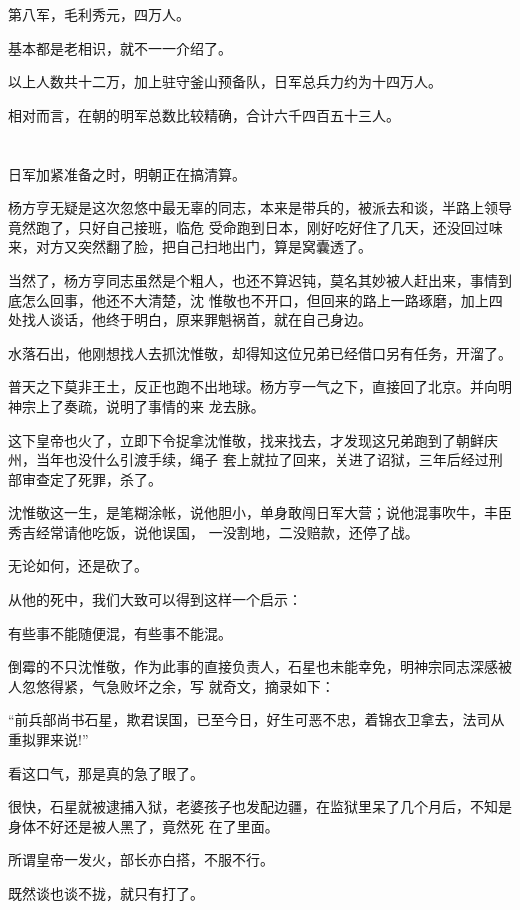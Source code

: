 \documentclass[11pt,a4paper,onecolumn]{article}
\begin{document}
第八军，毛利秀元，四万人。

基本都是老相识，就不一一介绍了。

以上人数共十二万，加上驻守釜山预备队，日军总兵力约为十四万人。

相对而言，在朝的明军总数比较精确，合计六千四百五十三人。

\section[\thesection]{}

日军加紧准备之时，明朝正在搞清算。

杨方亨无疑是这次忽悠中最无辜的同志，本来是带兵的，被派去和谈，半路上领导竟然跑了，只好自己接班，临危
受命跑到日本，刚好吃好住了几天，还没回过味来，对方又突然翻了脸，把自己扫地出门，算是窝囊透了。

当然了，杨方亨同志虽然是个粗人，也还不算迟钝，莫名其妙被人赶出来，事情到底怎么回事，他还不大清楚，沈
惟敬也不开口，但回来的路上一路琢磨，加上四处找人谈话，他终于明白，原来罪魁祸首，就在自己身边。

水落石出，他刚想找人去抓沈惟敬，却得知这位兄弟已经借口另有任务，开溜了。

普天之下莫非王土，反正也跑不出地球。杨方亨一气之下，直接回了北京。并向明神宗上了奏疏，说明了事情的来
龙去脉。

这下皇帝也火了，立即下令捉拿沈惟敬，找来找去，才发现这兄弟跑到了朝鲜庆州，当年也没什么引渡手续，绳子
套上就拉了回来，关进了诏狱，三年后经过刑部审查定了死罪，杀了。

沈惟敬这一生，是笔糊涂帐，说他胆小，单身敢闯日军大营；说他混事吹牛，丰臣秀吉经常请他吃饭，说他误国，
一没割地，二没赔款，还停了战。

无论如何，还是砍了。

从他的死中，我们大致可以得到这样一个启示：

有些事不能随便混，有些事不能混。

倒霉的不只沈惟敬，作为此事的直接负责人，石星也未能幸免，明神宗同志深感被人忽悠得紧，气急败坏之余，写
就奇文，摘录如下：

``前兵部尚书石星，欺君误国，已至今日，好生可恶不忠，着锦衣卫拿去，法司从重拟罪来说!''

看这口气，那是真的急了眼了。

很快，石星就被逮捕入狱，老婆孩子也发配边疆，在监狱里呆了几个月后，不知是身体不好还是被人黑了，竟然死
在了里面。

所谓皇帝一发火，部长亦白搭，不服不行。

既然谈也谈不拢，就只有打了。
\end{document}
